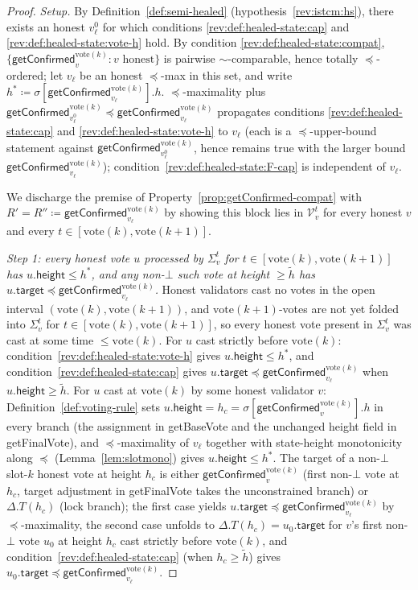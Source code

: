 \documentclass{article}
\newcommand{\V}[0]{\ensuremath{\mathcal{V}}}
\newcommand{\target}{\mathsf{target}}
\newcommand{\height}{\mathsf{height}}
\newcommand{\vote}{\ensuremath{\mathrm{vote}}}
\newcommand{\comm}[1]{\ensuremath{\widetilde{#1}}}
\newcommand{\getBaseVote}{\textsf{getBaseVote}\xspace}
\newcommand{\getFinalVote}{\textsf{getFinalVote}\xspace}
\newcommand{\getConfirmed}{\textsf{getConfirmed}\xspace}
\theoremstyle{plain}
\theoremstyle{definition}
\theoremstyle{remark}
\begin{document}
\begin{proof}
\emph{Setup.}
By Definition~\ref{def:semi-healed} (hypothesis~\ref{rev:istcm:hs}), there exists an honest $v_\ell^0$ for which conditions \ref{rev:def:healed-state:cap} and \ref{rev:def:healed-state:vote-h} hold.
By condition \ref{rev:def:healed-state:compat}, $\{\getConfirmed_v^{\vote(k)} : v \text{ honest}\}$ is pairwise $\sim$-comparable, hence totally $\preceq$-ordered;
let $v_\ell$ be an honest $\preceq$-max in this set, and write $h^\ast \coloneqq \sigma[\getConfirmed_{v_\ell}^{\vote(k)}].h$.
$\preceq$-maximality plus $\getConfirmed_{v_\ell^0}^{\vote(k)} \preceq \getConfirmed_{v_\ell}^{\vote(k)}$ propagates conditions \ref{rev:def:healed-state:cap} and \ref{rev:def:healed-state:vote-h} to $v_\ell$ (each is a $\preceq$-upper-bound statement against $\getConfirmed_{v_\ell^0}^{\vote(k)}$, hence remains true with the larger bound $\getConfirmed_{v_\ell}^{\vote(k)}$);
condition~\ref{rev:def:healed-state:F-cap} is independent of $v_\ell$.

We discharge the premise of Property~\ref{prop:getConfirmed-compat} with $R' = R'' \coloneqq \getConfirmed_{v_\ell}^{\vote(k)}$ by showing this block lies in $\V_v^t$ for every honest $v$ and every $t \in [\vote(k), \vote(k+1)]$.

\emph{Step 1: every honest vote $u$ processed by $\Sigma_v^t$ for $t \in [\vote(k), \vote(k+1)]$ has $u.\height \leq h^\ast$, and any non-$\bot$ such vote at height $\geq \comm{h}$ has $u.\target \preceq \getConfirmed_{v_\ell}^{\vote(k)}$.}
Honest validators cast no votes in the open interval $(\vote(k), \vote(k+1))$, and $\vote(k+1)$-votes are not yet folded into $\Sigma_v^t$ for $t \in [\vote(k), \vote(k+1)]$, so every honest vote present in $\Sigma_v^t$ was cast at some time $\leq \vote(k)$.
For $u$ cast strictly before $\vote(k)$: condition~\ref{rev:def:healed-state:vote-h} gives $u.\height \leq h^\ast$, and condition~\ref{rev:def:healed-state:cap} gives $u.\target \preceq \getConfirmed_{v_\ell}^{\vote(k)}$ when $u.\height \geq \comm{h}$.
For $u$ cast at $\vote(k)$ by some honest validator $v$: Definition~\ref{def:voting-rule} sets $u.\height = h_c = \sigma[\getConfirmed_v^{\vote(k)}].h$ in every branch (the assignment in \getBaseVote{} and the unchanged height field in \getFinalVote{}), and $\preceq$-maximality of $v_\ell$ together with state-height monotonicity along $\preceq$ (Lemma~\ref{lem:slotmono}) gives $u.\height \leq h^\ast$.
The target of a non-$\bot$ slot-$k$ honest vote at height $h_c$ is either $\getConfirmed_v^{\vote(k)}$ (first non-$\bot$ vote at $h_c$, target adjustment in \getFinalVote takes the unconstrained branch) or $\Delta.T(h_c)$ (lock branch); the first case yields $u.\target \preceq \getConfirmed_{v_\ell}^{\vote(k)}$ by $\preceq$-maximality, the second case unfolds to $\Delta.T(h_c) = u_0.\target$ for $v$'s first non-$\bot$ vote $u_0$ at height $h_c$ cast strictly before $\vote(k)$, and condition~\ref{rev:def:healed-state:cap} (when $h_c \geq \comm{h}$) gives $u_0.\target \preceq \getConfirmed_{v_\ell}^{\vote(k)}$.


\end{proof}
\end{document}
